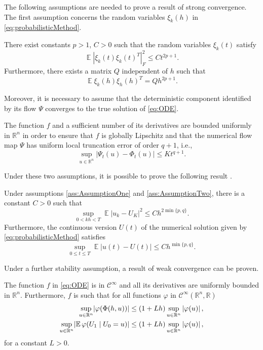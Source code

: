 \documentclass{siamart1116}
\numberwithin{theorem}{section}
\DeclarePairedDelimiter{\abs}{\lvert}{\rvert}
\renewcommand{\phi}{\varphi}
\newcommand{\R}{\mathbb{R}}
\newcommand{\E}{\operatorname{\mathbb{E}}}
\begin{document}
The following assumptions are needed to prove a result of strong convergence. The first assumption concerns the random variables $\xi_k(h)$ in \eqref{eq:probabilisticMethod}.
\begin{assumption}\label{ass:AssumptionOne} There exist constants $p > 1$, $C > 0$ such that the random variables $\xi_k(t)$ satisfy
\begin{equation}
	\E|\xi_k(t)\xi_k(t)^T|^2_F \leq Ct^{2p+1}.
\end{equation}
Furthermore, there exists a matrix $Q$ independent of $h$ such that 
\begin{equation}
	\E\xi_k(h)\xi_h(h)^T = Qh^{2p+1}.
\end{equation}
\end{assumption}
Moreover, it is necessary to assume that the deterministic component identified by its flow $\Psi$ converges to the true solution of \eqref{eq:ODE}. 
\begin{assumption}\label{ass:AssumptionTwo}  The function $f$ and a sufficient number of its derivatives are bounded uniformly in $\R^n$ in order to ensure that $f$ is globally Lipschitz and that the numerical flow map $\Psi$ has uniform local truncation error of order $q + 1$, i.e., 
	\begin{equation}
		\sup_{u\in\R^n} |\Psi_t(u) - \Phi_t(u)| \leq Kt^{q+1}.
	\end{equation}
\end{assumption}
Under these two assumptions, it is possible to prove the following result \cite{CGS16}.
\begin{theorem}\label{thm:strongConv} Under assumptions \ref{ass:AssumptionOne} and \ref{ass:AssumptionTwo}, there is a constant $C>0$ such that
	\begin{equation}\label{strongConvDisc}
		\sup_{0<kh<T} \E|u_k - U_K|^2 \leq Ch^{2\min\{p,q\}}.
	\end{equation}
	Furthermore, the continuous version $U(t)$ of the numerical solution given by \ref{eq:probabilisticMethod} satisfies
	\begin{equation}\label{strongConvCont}
		\sup_{0\leq t \leq T} \E|u(t) - U(t)| \leq Ch^{\min\{p, q\}}.
	\end{equation}
\end{theorem}

Under a further stability assumption, a result of weak convergence can be proven. 
\begin{assumption}\label{ass:AssumptionThree} The function $f$ in \eqref{eq:ODE} is in $\mathcal C^\infty$ and all its derivatives are uniformly bounded in $\R^n$. Furthermore, $f$ is such that for all functions $\phi$ in $\mathcal C ^\infty(\R^n, \R)$ 
	\begin{equation}
	\begin{aligned}
		\sup_{u\in\R^n} \abs{\phi(\Phi(h, u))} &\leq (1 + Lh) \sup_{u\in\R^n} \left|\phi(u)\right|, \\
		\sup_{u\in\R^n} \abs{\E \phi(U_1\mid U_0 = u)} &\leq (1 + Lh) \sup_{u\in\R^n} \left|\phi(u)\right|, \\
	\end{aligned}
	\end{equation}
	for a constant $L > 0$.
\end{assumption}
\end{document}
